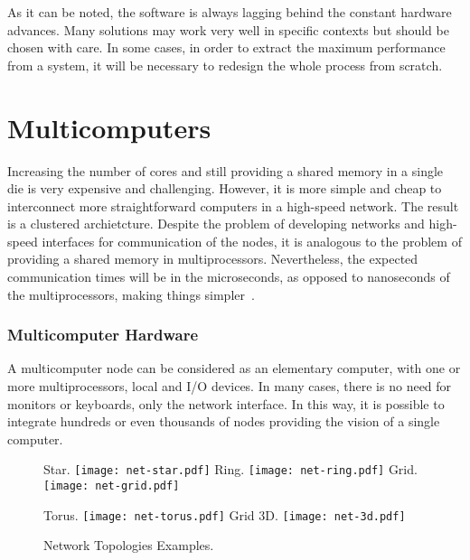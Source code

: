 			As it can be noted, the software is always lagging behind the constant hardware advances.
			Many solutions may work very well in specific contexts but should be chosen with care.
			In some cases, in order to extract the maximum performance from a system, it will be
			necessary to redesign the whole process from scratch.

	\section{Multicomputers}
	\label{sec.multicomputers}

		Increasing the number of cores and still providing a shared memory in a
		single die is very expensive and challenging.
		However, it is more simple and cheap to interconnect more straightforward
		computers in a high-speed network. The result is a clustered archietcture.
		Despite the problem of developing networks and high-speed interfaces
		for communication of the nodes, it is analogous to the problem of
		providing a shared memory in multiprocessors.
		Nevertheless, the expected communication times will be in the
		microseconds, as opposed to nanoseconds of the multiprocessors,
		making things simpler~\cite{tanenbaum:4ed}.

			\subsubsection{Multicomputer Hardware}
			\label{sec.multicomputers-hw}

				A multicomputer node can be considered as an elementary computer, with one or
				more multiprocessors, local \ram and I/O devices.
				In many cases, there is no need for monitors or keyboards, only the
				network interface.
				In this way, it is possible to integrate hundreds or even thousands
				of nodes providing the vision of a single computer.

				\begin{figure}[!tb]
					\centering%
					\caption{Network Topologies Examples.}%
					\label{fig:net-topologies}%

						{Star.}%
						{\texttt{[image: net-star.pdf]}}%
					\hspace{1cm}%
						{Ring.}%
						{\texttt{[image: net-ring.pdf]}}%
					\hspace{1cm}%
						{Grid.}%
						{\texttt{[image: net-grid.pdf]}}%

						{Torus.}%
						{\texttt{[image: net-torus.pdf]}}%
					\hspace{1cm}%
						{Grid 3D.}%
						{\texttt{[image: net-3d.pdf]}}%

				\end{figure}

